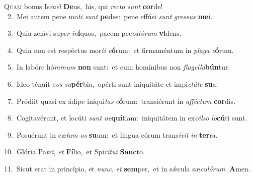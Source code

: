 \lettrine{\initial\textcolor{\initialcolor}{Q}}{uam} bonus Is\-\textit{ra}\-\textit{ël} \textbf{De}\-us,~\star his, qui \textit{rec}\-\textit{to} \textit{sunt} \textbf{cor}\-de!\\
{\numbfont\textcolor{\numbcolor}{~2.}}~Mei autem pene mo\textit{ti} \textit{sunt} \textbf{pe}\-des:~\star pene effúsi \textit{sunt} \textit{gres}\-\textit{sus} \textbf{me}\-i.\par
{\numbfont\textcolor{\numbcolor}{~3.}}~Quia zelávi su\textit{per} \textit{in}\-\textbf{í}quos,~\star pacem pec\-\textit{ca}\-\textit{tó}\textit{rum} \textbf{vi}\-dens.\par
{\numbfont\textcolor{\numbcolor}{~4.}}~Quia non est respéctus mor\textit{ti} \textit{e}\-\textbf{ó}rum:~\star et firmaméntum in \textit{pla}\-\textit{ga} \textit{e}\-\textbf{ó}rum.\par
{\numbfont\textcolor{\numbcolor}{~5.}}~In labóre hó\-\textit{mi}\-\textit{num} \textbf{non} sunt:~\star et cum homínibus non \textit{fla}\-\textit{gel}\textit{la}\textbf{bún}tur:\par
{\numbfont\textcolor{\numbcolor}{~6.}}~Ideo ténuit e\textit{os} \textit{su}\-\textbf{pér}bia,~\star opérti sunt iniquitáte et impi\-\textit{e}\-\textit{tá}\textit{te} \textbf{su}\-a.\par
{\numbfont\textcolor{\numbcolor}{~7.}}~Pródiit quasi ex ádipe iníqui\textit{tas} \textit{e}\-\textbf{ó}rum:~\star transiérunt in \textit{af}\-\textit{féc}\textit{tum} \textbf{cor}\-dis.\par
{\numbfont\textcolor{\numbcolor}{~8.}}~Cogitavérunt, et locúti \textit{sunt} \textit{ne}\-\textbf{quí}tiam:~\star iniquitátem in ex\-\textit{cél}\-\textit{so} \textit{lo}\-\textbf{cú}ti sunt.\par
{\numbfont\textcolor{\numbcolor}{~9.}}~Posuérunt in cæ\textit{lum} \textit{os} \textbf{su}\-um:~\star et lingua eórum trans\-\textit{í}\-\textit{vit} \textit{in} \textbf{ter}\-ra.\par
{\numbfont\textcolor{\numbcolor}{10.}}~Glória Pa\-\textit{tri}\-, \textit{et} \textbf{Fí}\-lio,~\star et Spi\-\textit{rí}\-\textit{tu}\textit{i} \textbf{Sanc}\-to.\par
{\numbfont\textcolor{\numbcolor}{11.}}~Sicut erat in princípio, et \textit{nunc}\-, \textit{et} \textbf{sem}\-per,~\star et in sǽcula sæ\-\textit{cu}\-\textit{ló}\textit{rum}. \textbf{A}\-men.\par
